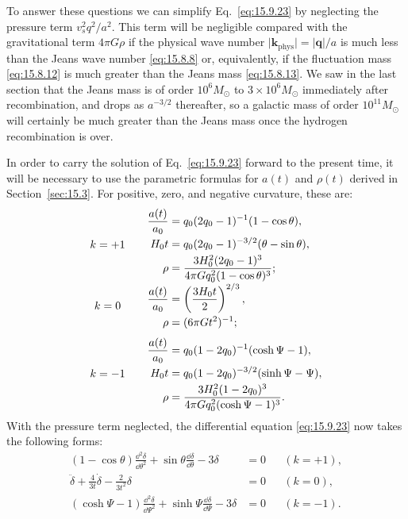 To answer these questions we can simplify Eq.~\eqref{eq:15.9.23} by
neglecting the pressure term \(v_s^2q^2/a^2\). This term will be negligible
compared with the gravitational term \(4\pi G\rho\) if the physical wave
number \(\lvert\mathbf{k}_{\mathrm{phys}}\rvert=\lvert\mathbf q\rvert/a\)
is much less than the Jeans wave number \eqref{eq:15.8.8} or, equivalently,
if the fluctuation mass \eqref{eq:15.8.12} is much greater than the Jeans
mass \eqref{eq:15.8.13}. We saw in the last section that the Jeans mass is
of order \(10^6M_\odot\) to \(3\times10^6M_\odot\) immediately after
recombination, and drops as \(a^{-3/2}\) thereafter, so a galactic mass of
order \(10^{11}M_\odot\) will certainly be much greater than the Jeans mass
once the hydrogen recombination is over.

In order to carry the solution of Eq.~\eqref{eq:15.9.23} forward to the
present time, it will be necessary to use the parametric formulas for \(a(t)\)
and \(\rho(t)\) derived in Section~\ref{sec:15.3}. For positive, zero, and
negative curvature, these are:
\[
\begin{array}{c@{\qquad}l}
k=+1&
\begin{aligned}
  \frac{a(t)}{a_0}
  &=q_0(2q_0-1)^{-1}(1-\cos\theta),\\
  H_0t
  &=q_0(2q_0-1)^{-3/2}(\theta-\sin\theta),\\
  \rho
  &=
  \frac{3H_0^2(2q_0-1)^3}
       {4\pi Gq_0^2(1-\cos\theta)^3};
\end{aligned}\\[2.8em]
k=0&
\begin{aligned}
  \frac{a(t)}{a_0}
  &=\left(\frac{3H_0t}{2}\right)^{2/3},\\
  \rho&=(6\pi Gt^2)^{-1};
\end{aligned}\\[2.2em]
k=-1&
\begin{aligned}
  \frac{a(t)}{a_0}
  &=q_0(1-2q_0)^{-1}(\cosh\Psi-1),\\
  H_0t
  &=q_0(1-2q_0)^{-3/2}(\sinh\Psi-\Psi),\\
  \rho
  &=
  \frac{3H_0^2(1-2q_0)^3}
       {4\pi Gq_0^2(\cosh\Psi-1)^3}.
\end{aligned}
\end{array}
\]
With the pressure term neglected, the differential equation
\eqref{eq:15.9.23} now takes the following forms:
\begin{align}
  (1-\cos\theta)\frac{\dd^2\delta}{\dd\theta^2}
  +\sin\theta\frac{\dd\delta}{\dd\theta}
  -3\delta
  &=0
  &&(k=+1),
  \tag{15.9.24}\label{eq:15.9.24}\\
  \ddot\delta+\frac4{3t}\dot\delta-\frac2{3t^2}\delta
  &=0
  &&(k=0),
  \tag{15.9.25}\label{eq:15.9.25}\\
  (\cosh\Psi-1)\frac{\dd^2\delta}{\dd\Psi^2}
  +\sinh\Psi\frac{\dd\delta}{\dd\Psi}
  -3\delta
  &=0
  &&(k=-1).
  \tag{15.9.26}\label{eq:15.9.26}
\end{align}
